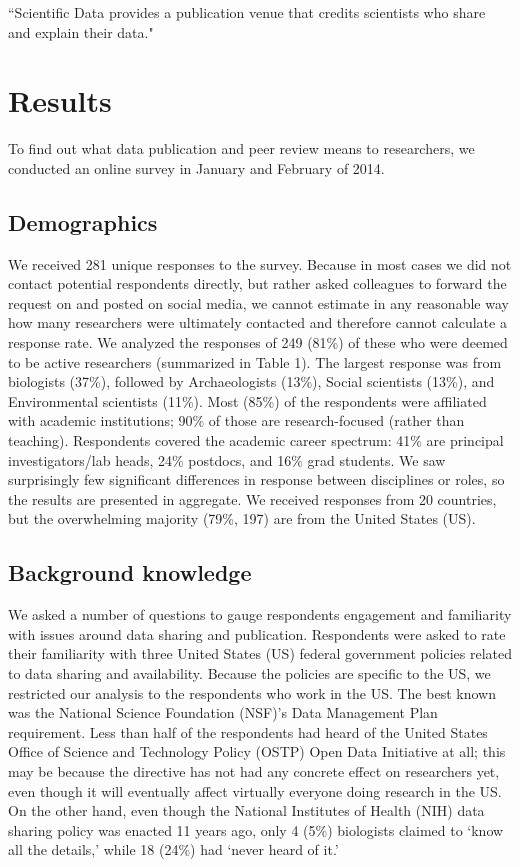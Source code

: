 \documentclass[10pt]{article}
\begin{document}
``Scientific Data provides a publication venue that credits scientists who share and explain their data." \cite{_more_2014}


\section*{Results}
To find out what data publication and peer review means to researchers, we conducted an online survey in January and February of 2014.

\subsection*{Demographics}

We received 281 unique responses to the survey.
Because in most cases we did not contact potential respondents directly, but rather asked colleagues to forward the request on and posted on social media, we cannot estimate in any reasonable way how many researchers were ultimately contacted and therefore cannot calculate a response rate.
We analyzed the responses of 249 (81\%) of these who were deemed to be active researchers (summarized in Table 1).
The largest response was from biologists (37\%), followed by Archaeologists (13\%), Social scientists (13\%), and Environmental scientists (11\%).
Most (85\%) of the respondents were affiliated with academic institutions; 90\% of those are research-focused (rather than teaching).
Respondents covered the academic career spectrum: 41\% are principal investigators/lab heads, 24\% postdocs, and 16\% grad students.
We saw surprisingly few significant differences in response between disciplines or roles, so the results are presented in aggregate.
We received responses from 20 countries, but the overwhelming majority (79\%, 197) are from the United States (US).

\subsection*{Background knowledge}

We asked a number of questions to gauge respondents engagement and familiarity with issues around data sharing and publication.
Respondents were asked to rate their familiarity with three United States (US) federal government policies related to data sharing and availability.
Because the policies are specific to the US, we restricted our analysis to the respondents who work in the US.
The best known was the National Science Foundation (NSF)'s Data Management Plan requirement\cite{national_science_foundation_gpg_2011}.
Less than half of the respondents had heard of the United States Office of Science and Technology Policy (OSTP) Open Data Initiative\cite{obama_making_2013} at all; this may be because the directive has not had any concrete effect on researchers yet, even though it will eventually affect virtually everyone doing research in the US.
On the other hand, even though the National Institutes of Health (NIH) data sharing policy\cite{national_institutes_of_health_final_2003} was enacted 11 years ago, only 4 (5\%) biologists claimed to `know all the details,' while 18 (24\%) had `never heard of it.'
\end{document}
